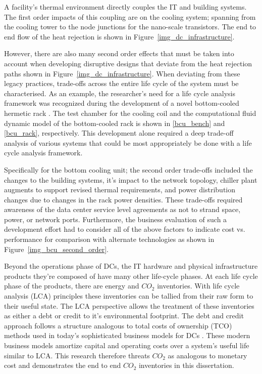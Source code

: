     
    
    A facility's thermal environment directly couples the IT and building systems. The first order impacts of this coupling are on the cooling system; spanning from the cooling tower to the node junctions for the nano-scale transistors. The end to end flow of the heat rejection is shown in Figure~\ref{img_dc_infrastructure}. 
    
    
    
    However, there are also many second order effects that must be taken into account when developing disruptive designs that deviate from the heat rejection paths shown in Figure~\ref{img_dc_infrastructure}. When deviating from these legacy practices, trade-offs across the entire life cycle of the system must be characterised. As an example, the researcher's need for a life cycle analysis framework was recognized during the development of a novel bottom-cooled hermetic rack \cite{gao16}. The test chamber for the cooling coil and the computational fluid dynamic model of the bottom-cooled rack is shown in \ref{bcu_bench} and \ref{bcu_rack}, respectively. This development alone required a deep trade-off analysis of various systems that could be most appropriately be done with a life cycle analysis framework. 
    
    
    
    Specifically for the bottom cooling unit; the second order trade-offs included the changes to the building systems, it's impact to the network topology, chiller plant augments to support revised thermal requirements, and power distribution changes due to changes in the rack power densities. These trade-offs required awareness of the data center service level agreements as not to strand space, power, or network ports. Furthermore, the business evaluation of such a development effort had to consider all of the above factors to indicate cost vs. performance for comparison with alternate technologies as shown in Figure~\ref{img_bcu_second_order}.
    
    
    
    Beyond the operations phase of DCs, the IT hardware and physical infrastructure products they're composed of have many other life-cycle phases. At each life cycle phase of the products, there are energy and $CO_2$ inventories. With life cycle analysis (LCA) principles these inventories can be tallied from their raw form to their useful state.  The LCA perspective allows the treatment of these inventories as either a debt or credit to it's environmental footprint. The debt and credit approach follows a structure analogous to total costs of ownership (TCO) methods used in today's sophisticated business models for DCs \cite{Hardy12}. These modern business models amortize capital and operating costs over a system's useful life similar to LCA. This research therefore threats $CO_2$ as analogous to monetary cost and demonstrates the end to end $CO_2$ inventories in this dissertation.
    
